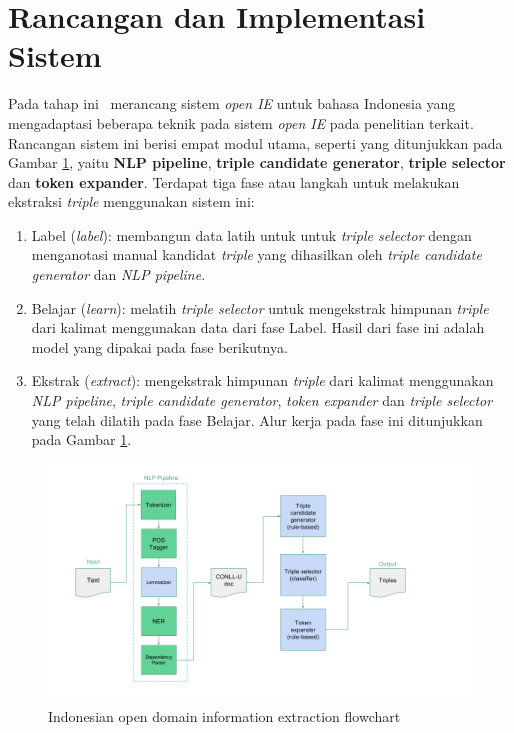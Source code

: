 \section{Rancangan dan Implementasi Sistem}

Pada tahap ini \saya~merancang sistem \textit{open IE} untuk bahasa Indonesia yang mengadaptasi beberapa teknik pada sistem \textit{open IE} pada penelitian terkait. Rancangan sistem ini berisi empat modul utama, seperti yang ditunjukkan pada Gambar \ref{fig:program_flowchart}, yaitu \textbf{NLP pipeline}, \textbf{triple candidate generator}, \textbf{triple selector} dan \textbf{token expander}. Terdapat tiga fase atau langkah untuk melakukan ekstraksi \textit{triple} menggunakan sistem ini:

\begin{enumerate}
	\item Label (\textit{label}): membangun data latih untuk untuk \textit{triple selector} dengan menganotasi manual kandidat \textit{triple} yang dihasilkan oleh \textit{triple candidate generator} dan \textit{NLP pipeline}.  
	\item Belajar (\textit{learn}): melatih \textit{triple selector} untuk mengekstrak himpunan \textit{triple} dari kalimat menggunakan data dari fase Label. Hasil dari fase ini adalah model yang dipakai pada fase berikutnya.
	\item Ekstrak (\textit{extract}): mengekstrak himpunan \textit{triple} dari kalimat menggunakan \textit{NLP pipeline}, \textit{triple candidate generator}, \textit{token expander} dan \textit{triple selector} yang telah dilatih pada fase Belajar. Alur kerja pada fase ini ditunjukkan pada Gambar \ref{fig:program_flowchart}.
\end{enumerate}



\begin{figure}
\centering
\includegraphics[width=\textwidth]{../images/program_flowchart.png}
\caption{Indonesian open domain information extraction flowchart}
\label{fig:program_flowchart}
\end{figure}

